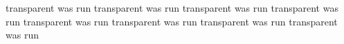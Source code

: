 transparent was run
transparent was run
transparent was run
transparent was run
transparent was run
transparent was run
transparent was run
transparent was run
